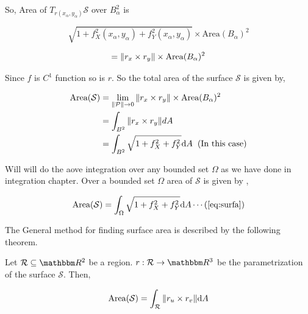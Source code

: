 \documentclass[../Analysis-3]{subfiles}
\begin{document}
So, Area of $T_{r(x_{\alpha},y_{\alpha})} \mathcal{S}$ over $B_{\alpha}^2$ is

$$\sqrt{1 + f_X^2(x_{\alpha},y_{\alpha}) + f_Y^2(x_{\alpha},y_{\alpha})} \times \text{Area}(B_{\alpha})^2$$

$$ = \norm{r_x \times r_y} \times \text{Area}(B_{\alpha})^2$$

\pagebreak

Since $f$ is $C^1$ function so is $r$. So the total area of the surface $\mathcal{S}$ is given by,

\begin{align*}
    \text{Area} (\mathcal{S}) & = \lim_{\norm{\mathcal{P}} \to 0} \norm{r_x \times r_y} \times \text{Area}(B_{\alpha})^2 \\
                              & = \int_{B^2} \norm{r_x \times r_y} dA                                                    \\
                              & = \int_{B^2} \sqrt{1 + f_X^2 +f_Y^2} \dd A \hspace{0.2cm}(\text{In this case})
\end{align*}

Will will do the aove integration over any bounded set $\Omega$ as we have done in  integration chapter. Over a bounded set $\Omega$ area of $\mathcal{S}$ is given by ,

\[\text{Area} (\mathcal{S}) =  \int_{\Omega} \sqrt{1 + f_X^2 +f_Y^2} \dd A \label{eq:surfa} \cdots  (\ref{eq:surfa})\]

The General method for finding surface area is described by the following theorem.

\begin{Thm}{}{}
    Let $\mathcal{R} \subseteq \R^2$ be a region. $r : \mathcal{R} \to \R^3$ be the parametrization of the surface $\mathcal{S}$. Then,

    \[\text{Area}(\mathcal{S}) = \int_{\mathcal{R}} \norm{r_u \times r_v} \dd A\]
\end{Thm}
\end{document}
